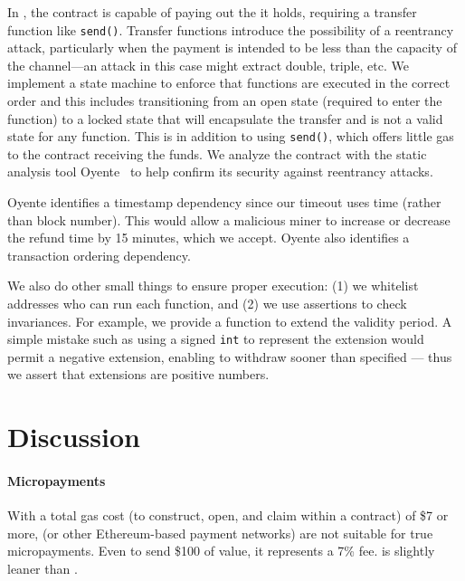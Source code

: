 In \ew, the contract is capable of paying out the \eth it holds, requiring a transfer function like \texttt{send()}. Transfer functions introduce the possibility of a reentrancy attack, particularly when the payment is intended to be less than the capacity of the channel---\eg an attack in this case might extract double, triple, etc. We implement a state machine to enforce that functions are executed in the correct order and this includes transitioning from an open state (required to enter the function) to a locked state that will encapsulate the transfer and is not a valid state for any function. This is in addition to using \texttt{send()}, which offers little gas to the contract receiving the funds. We analyze the contract with the static analysis tool Oyente~\cite{LCOSH16} to help confirm its security against reentrancy attacks. 

Oyente identifies a timestamp dependency since our timeout uses time (rather than block number). This would allow a malicious miner to increase or decrease the refund time by 15 minutes, which we accept. Oyente also identifies a transaction ordering dependency. 

We also do other small things to ensure proper execution: (1) we whitelist addresses who can run each function, and (2) we use assertions to check invariances. For example, we provide a function to extend the validity period. A simple mistake such as using a signed \texttt{int} to represent the extension would permit a negative extension, enabling \make to withdraw sooner than specified --- thus we assert that extensions are positive numbers.


\section{Discussion}

\paragraph{Micropayments} 

With a total gas cost (to construct, open, and claim within a contract) of \$7 or more, \ew (or other Ethereum-based payment networks) are not suitable for true micropayments. Even to send \$100 of value, it represents a 7\% fee. \eww is slightly leaner than \ew {}.

